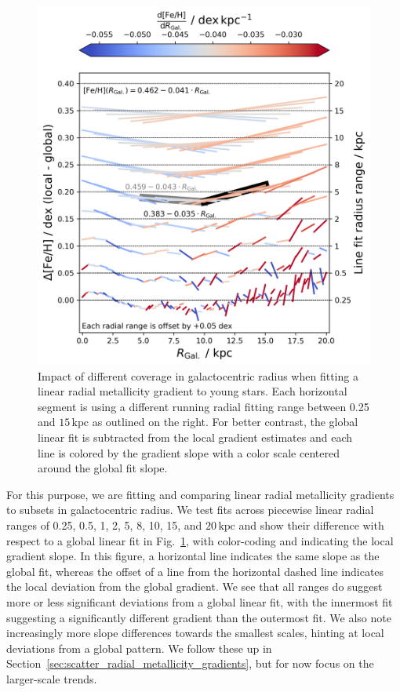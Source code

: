 \documentclass[fleqn,usenatbib]{mnras}
\begin{document}
\begin{figure}
    \centering
    \includegraphics[width=\columnwidth]{figures/radial_range_impact.png}
    \caption{Impact of different coverage in galactocentric radius when fitting a linear radial metallicity gradient to young stars. Each horizontal segment is using a different running radial fitting range between 0.25 and $15\,\mathrm{kpc}$ as outlined on the right. For better contrast, the global linear fit is subtracted from the local gradient estimates and each line is colored by the gradient slope with a color scale centered around the global fit slope.}
    \label{fig:radial_range_impact}
\end{figure}

For this purpose, we are fitting and comparing linear radial metallicity gradients to subsets in galactocentric radius. We test fits across piecewise linear radial ranges of 0.25, 0.5, 1, 2, 5, 8, 10, 15, and $20\,\mathrm{kpc}$ and show their difference with respect to a global linear fit in Fig.~\ref{fig:radial_range_impact}, with color-coding and indicating the local gradient slope. In this figure, a horizontal line indicates the same slope as the global fit, whereas the offset of a line from the horizontal dashed line indicates the local deviation from the global gradient. We see that all ranges do suggest more or less significant deviations from a global linear fit, with the innermost fit suggesting a significantly different gradient than the outermost fit. We also note increasingly more slope differences towards the smallest scales, hinting at local deviations from a global pattern. We follow these up in Section~\ref{sec:scatter_radial_metallicity_gradients}, but for now focus on the larger-scale trends.
\end{document}
